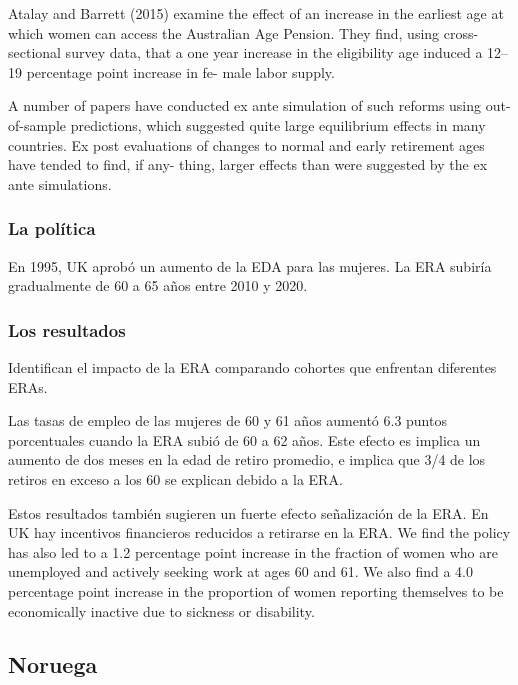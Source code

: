 \documentclass[]{article}
\begin{document}
Atalay and Barrett (2015) examine the effect of an increase in the
earliest age at which women can access the Australian Age Pension. They
find, using cross-sectional survey data, that a one year increase in the
eligibility age induced a 12--19 percentage point increase in fe- male
labor supply.

A number of papers have conducted ex ante simulation of such reforms
using out-of-sample predictions, which suggested quite large equilibrium
effects in many countries. Ex post evaluations of changes to normal and
early retirement ages have tended to find, if any- thing, larger effects
than were suggested by the ex ante simulations.

\hypertarget{la-poluxedtica}{%
\subsubsection{La política}\label{la-poluxedtica}}

En 1995, UK aprobó un aumento de la EDA para las mujeres. La ERA subiría
gradualmente de 60 a 65 años entre 2010 y 2020.

\hypertarget{los-resultados}{%
\subsubsection{Los resultados}\label{los-resultados}}

Identifican el impacto de la ERA comparando cohortes que enfrentan
diferentes ERAs.

Las tasas de empleo de las mujeres de 60 y 61 años aumentó 6.3 puntos
porcentuales cuando la ERA subió de 60 a 62 años. Este efecto es implica
un aumento de dos meses en la edad de retiro promedio, e implica que 3/4
de los retiros en exceso a los 60 se explican debido a la ERA.

Estos resultados también sugieren un fuerte efecto señalización de la
ERA. En UK hay incentivos financieros reducidos a retirarse en la ERA.
We find the policy has also led to a 1.2 percentage point increase in
the fraction of women who are unemployed and actively seeking work at
ages 60 and 61. We also find a 4.0 percentage point increase in the
proportion of women reporting themselves to be economically inactive due
to sickness or disability.

\hypertarget{noruega}{%
\subsection{Noruega}\label{noruega}}
\end{document}
